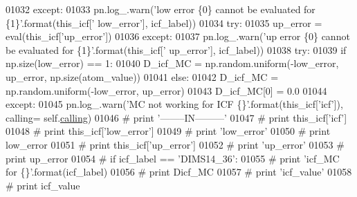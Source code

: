 \begin{DoxyCode}
01032                             \textcolor{keywordflow}{except}:
01033                                 pn.log\_.warn(\textcolor{stringliteral}{'low error \{0\} cannot be evaluated for \{1\}'}.format(this\_icf[\textcolor{stringliteral}{'
      low\_error'}], icf\_label))
01034                             \textcolor{keywordflow}{try}:
01035                                 up\_error = eval(this\_icf[\textcolor{stringliteral}{'up\_error'}])
01036                             \textcolor{keywordflow}{except}:
01037                                 pn.log\_.warn(\textcolor{stringliteral}{'up error \{0\} cannot be evaluated for \{1\}'}.format(this\_icf[\textcolor{stringliteral}{'
      up\_error'}], icf\_label))
01038                             \textcolor{keywordflow}{try}:
01039                                 \textcolor{keywordflow}{if} np.size(low\_error) == 1:
01040                                     D\_icf\_MC = np.random.uniform(-low\_error, up\_error, np.size(atom\_value))
01041                                 \textcolor{keywordflow}{else}:
01042                                     D\_icf\_MC = np.random.uniform(-low\_error, up\_error)
01043                                 D\_icf\_MC[0] = 0.0
01044                             \textcolor{keywordflow}{except}:
01045                                 pn.log\_.warn(\textcolor{stringliteral}{'MC not working for ICF \{\}'}.format(this\_icf[\textcolor{stringliteral}{'icf'}]), calling=
      self.\hyperlink{classpyneb_1_1core_1_1icf_1_1_i_c_f_aaeb9b3827ef557a32b109baef31da77f}{calling})
01046 \textcolor{comment}{#                             print '--------IN---------'}
01047 \textcolor{comment}{#                             print this\_icf['icf']}
01048 \textcolor{comment}{#                             print this\_icf['low\_error']}
01049 \textcolor{comment}{#                             print 'low\_error'}
01050 \textcolor{comment}{#                             print low\_error}
01051 \textcolor{comment}{#                             print this\_icf['up\_error']}
01052 \textcolor{comment}{#                             print 'up\_error'}
01053 \textcolor{comment}{#                             print up\_error}
01054 \textcolor{comment}{#                             if icf\_label == 'DIMS14\_36':}
01055 \textcolor{comment}{#                                 print 'icf\_MC for \{\}'.format(icf\_label)}
01056 \textcolor{comment}{#                                 print Dicf\_MC}
01057 \textcolor{comment}{#                                 print 'icf\_value'                            }
01058 \textcolor{comment}{#                                 print icf\_value}

\end{DoxyCode}
